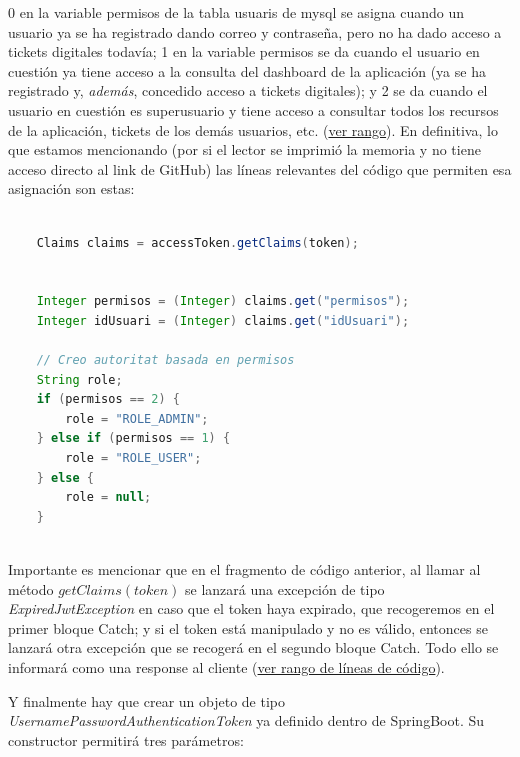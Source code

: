 \documentclass[a4paper,12pt]{report}
\begin{document}
		  0 en la variable permisos de la tabla usuaris de mysql se asigna cuando un usuario ya se ha registrado dando correo y contraseña, pero no ha dado acceso a tickets digitales todavía; 1 en la variable permisos se da cuando el usuario en cuestión ya tiene acceso a la consulta del dashboard de la aplicación (ya se ha registrado y, \textit{además}, concedido acceso a tickets digitales); y 2 se da cuando el usuario en cuestión es superusuario y tiene acceso a consultar todos los recursos de la aplicación, tickets de los demás usuarios, etc. (\href{https://github.com/blackcub3s/mercApp/blob/89efcf854d8bbab2addde3f7e817eb97f7737b95/APP%20WEB/__springboot__produccio__/app/src/main/java/miApp/app/seguretat/FiltreAutenticacioJwt.java#L56-L66}{ver rango}). En definitiva, lo que estamos mencionando (por si el lector se imprimió la memoria y no tiene acceso directo al link de GitHub) las líneas relevantes del código que permiten esa asignación son estas:
		  
		  
		  
		  \begin{lstlisting}[language=Java, basicstyle=\ttfamily\footnotesize, keywordstyle=\color{magenta}]
		  
	Claims claims = accessToken.getClaims(token);
	
	
	Integer permisos = (Integer) claims.get("permisos"); 
	Integer idUsuari = (Integer) claims.get("idUsuari"); 
	
	// Creo autoritat basada en permisos
	String role;
	if (permisos == 2) {
	  	role = "ROLE_ADMIN";
	} else if (permisos == 1) {
	  	role = "ROLE_USER";
	} else {
	  	role = null;
	}
		  
		  \end{lstlisting}
		  
		  Importante es mencionar que en el fragmento de código anterior, al llamar al método $getClaims(token)$  se lanzará una excepción de tipo \textit{ExpiredJwtException} en caso que el token haya expirado, que recogeremos en el primer bloque Catch; y si el token está manipulado y no es válido, entonces se lanzará otra excepción que se recogerá en el segundo bloque Catch. Todo ello se informará como una response al cliente (\href{https://github.com/blackcub3s/mercApp/blob/89efcf854d8bbab2addde3f7e817eb97f7737b95/APP%20WEB/__springboot__produccio__/app/src/main/java/miApp/app/seguretat/FiltreAutenticacioJwt.java#L96-L115}{ver rango de líneas de código}).
		  
		  
		  Y finalmente hay que crear un objeto de tipo \textit{UsernamePasswordAuthenticationToken} ya definido dentro de SpringBoot. Su constructor permitirá tres parámetros: 
		 
\end{document}
